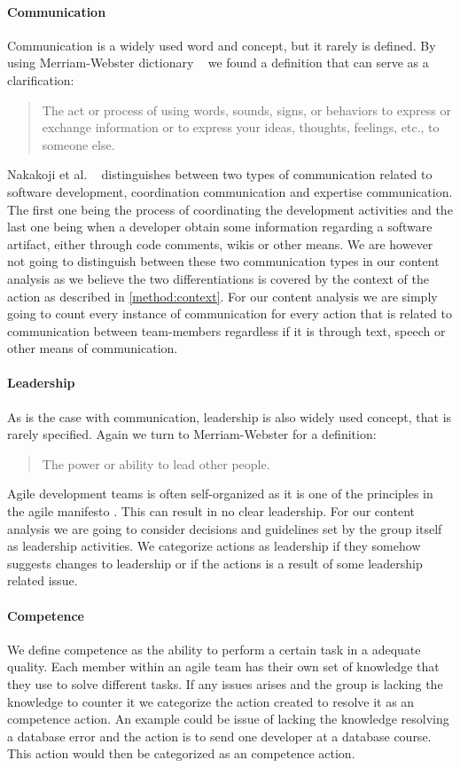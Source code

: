 \paragraph{Communication}
Communication is a widely used word and concept, but it rarely is defined. By using Merriam-Webster dictionary ~\cite{MerriamWebster2015} we found a definition that can serve as a clarification: 
\begin{quote}
The act or process of using words, sounds, signs, or behaviors to express or exchange information or to express your ideas, thoughts, feelings, etc., to someone else.
\end{quote}
Nakakoji et al. ~\cite{Nakakoji2010} distinguishes between two types of communication related to software development, coordination communication and expertise communication. The first one being the process of coordinating the development activities and the last one being when a developer obtain some information regarding a software artifact, either through code comments, wikis or other means. 
We are however not going to distinguish between these two communication types in our content analysis as we believe the two differentiations is covered by the context of the action as described in \autoref{method:context}. For our content analysis we are simply going to count every instance of communication for every action that is related to communication between team-members regardless if it is through text, speech or other means of communication.
\paragraph{Leadership}
As is the case with communication, leadership is also widely used concept, that is rarely specified. Again we turn to Merriam-Webster \cite{MerriamWebster2015} for a definition: 
\begin{quote}
The power or ability to lead other people.
\end{quote}
Agile development teams is often self-organized as it is one of the principles in the agile manifesto \cite{AgileManifesto2015}. This can result in no clear leadership. For our content analysis we are going to consider decisions and guidelines set by the group itself as leadership activities. We categorize actions as leadership if they somehow suggests changes to leadership or if the actions is a result of some leadership related issue. 
\paragraph{Competence}
We define competence as the ability to perform a certain task in a adequate quality. Each member within an agile team has their own set of knowledge that they use to solve different tasks. If any issues arises and the group is lacking the knowledge to counter it we categorize the action created to resolve it as an competence action. An example could be issue of lacking the knowledge resolving a database error and the action is to send one developer at a database course. This action would then be categorized as an competence action.
